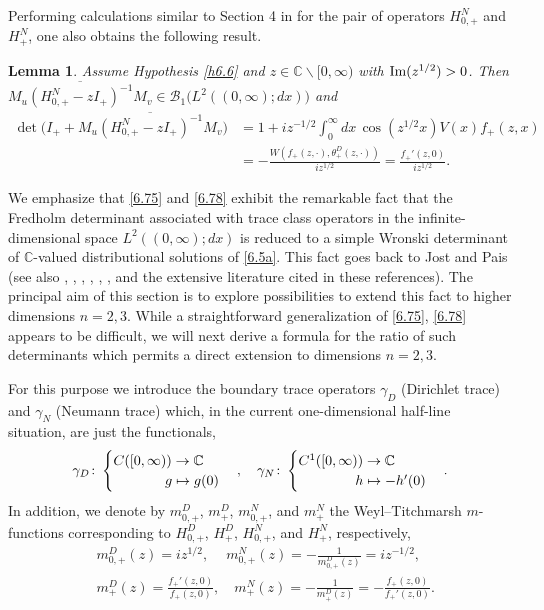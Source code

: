 \documentclass[reqno,10pt, centertags]{amsart}
\newcommand{\bbC}{{\mathbb{C}}}
\newcommand{\cB}{{\mathcal B}}
\newcommand{\no}{\nonumber}
\newcommand{\lb}{\label}
\newcommand{\ol}{\overline}
\newcommand{\ga}{\gamma}
\renewcommand{\Im}{\text{\rm Im}}
\numberwithin{equation}{section}
\newtheorem{lemma}[theorem]{Lemma}
\theoremstyle{definition}
\begin{document}
Performing calculations similar to Section 4 in \cite{GM03} for the
pair of operators $H_{0,+}^N$ and $H_+^N$, one also obtains the
following result.

\begin{lemma} \lb{l6.8}
Assume Hypothesis \ref{h6.6} and $z\in\bbC\backslash [0,\infty)$
with $\Im(z^{1/2})>0$. Then $\ol{M_u(H_{0,+}^N-z I_+)^{-1}M_v} \in
\cB_1\big(L^2((0,\infty);dx)\big)$ and
\begin{align}
\det\big(I_+ +\ol{M_u(H_{0, +}^N-z I_+)^{-1}M_v}\big)
&= 1+ i z^{-1/2} \int_0^\infty
dx\, \cos(z^{1/2}x)V(x)f_+(z,x) \no  \\
&= - \frac{W(f_+(z,\cdot),\theta_+^D (z,\cdot))}{i z^{1/2}} =
\frac{f_+'(z,0)}{i z^{1/2}}. \lb{6.78}
\end{align}
\end{lemma}

We emphasize that \eqref{6.75} and \eqref{6.78} exhibit the remarkable
fact that the Fredholm determinant associated with trace class operators
in the infinite-dimensional space $L^2((0,\infty); dx)$ is reduced to a
simple Wronski determinant of $\bbC$-valued distributional solutions of
\eqref{6.5a}. This fact goes back to Jost and Pais \cite{JP51} (see
also \cite{GM03}, \cite{Ne72}, \cite{Ne80}, \cite[Sect.\ 12.1.2]{Ne02},
\cite[Proposition 5.7]{Si79}, \cite{Si00}, and the extensive literature
cited in these references). The principal aim of this section is to explore
possibilities to extend this fact to higher dimensions
$n=2,3$. While a straightforward generalization of \eqref{6.75},
\eqref{6.78} appears to be difficult, we will next derive a formula for
the ratio of such determinants which permits a direct extension to
dimensions $n=2,3$.

For this purpose we introduce the boundary trace operators
$\ga_D$ (Dirichlet trace) and $\ga_N$ (Neumann trace) which, in the
current one-dimensional half-line situation, are just the functionals,
\begin{equation}
\ga_D \colon \begin{cases} C([0,\infty)) \to \bbC \\
\hspace*{1.3cm} g \mapsto g(0) \end{cases}, \quad
\ga_N \colon \begin{cases}C^1([0,\infty)) \to \bbC  \\
\hspace*{1.43cm} h \mapsto   - h'(0) \end{cases}.
\end{equation}
In addition, we denote by $m_{0,+}^D$, $m_+^D$, $m_{0,+}^N$, and $m_+^N$
the Weyl--Titchmarsh $m$-functions corresponding to $H_{0,+}^D$,
$H_{+}^D$, $H_{0,+}^N$, and $H_{+}^N$, respectively,
\begin{align}
&m_{0,+}^D(z) = i z^{1/2},\ \quad m_{0,+}^N (z)= -\frac{1}{m_{0,+}^D(z)}
= i z^{-1/2},  \lb{6.16a} \\
&m_{+}^D(z) = \frac{f_+'(z,0)}{f_+(z,0)}, \quad m_{+}^N (z)=
-\frac{1}{m_{+}^D(z)} = -\frac{f_+(z,0)}{f_+'(z,0)}.  \lb{6.17a}
\end{align}
\end{document}
